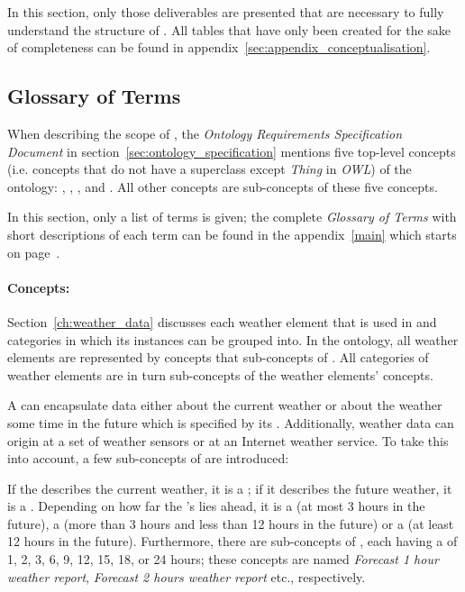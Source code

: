 In this section, only those deliverables are presented that are necessary to fully understand the structure of \thinkhomeweather. All tables that have only been created for the sake of completeness can be found in appendix~\ref{sec:appendix_conceptualisation}.

\subsection{Glossary of Terms}
\label{sec:ontology_glossary}

When describing the scope of \thinkhomeweather, the \emph{Ontology Requirements Specification Document} in section~\ref{sec:ontology_specification} mentions five top-level concepts (i.e. concepts that do not have a superclass except \emph{Thing} in \emph{OWL}) of the ontology: , , , and . All other concepts are sub-concepts of these five concepts.

In this section, only a list of terms is given; the complete \emph{Glossary of Terms} with short descriptions of each term can be found in the appendix~\ref{main} which starts on page~\pageref{main}.

\paragraph{Concepts:}

Section~\ref{ch:weather_data} discusses each weather element that is used in \thinkhomeweather and categories in which its instances can be grouped into. In the ontology, all weather elements are represented by concepts that sub-concepts of . All categories of weather elements are in turn sub-concepts of the weather elements' concepts.

A  can encapsulate data either about the current weather or about the weather some time in the future which is specified by its . Additionally, weather data can origin at a set of weather sensors or at an Internet weather service. To take this into account, a few sub-concepts of  are introduced:

If the  describes the current weather, it is a ; if it describes the future weather, it is a . Depending on how far the 's  lies ahead, it is a  (at most 3 hours in the future), a  (more than 3 hours and less than 12 hours in the future) or a  (at least 12 hours in the future). Furthermore, there are sub-concepts of , each having a  of 1, 2, 3, 6, 9, 12, 15, 18, or 24 hours; these concepts are named \emph{Forecast 1 hour weather report}, \emph{Forecast 2 hours weather report} etc., respectively.

